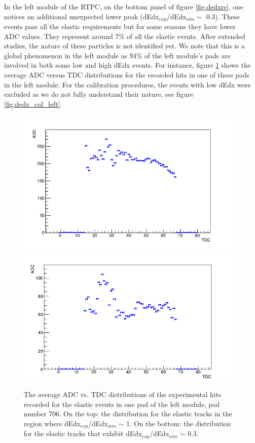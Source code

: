 In the left module of the RTPC, on the bottom panel of figure \ref{fig:dedxre}, 
one notices an additional unexpected lower peak (dEdx$_{exp}$/dEdx$_{sim} \sim$ 
0.3). These events pass all the elastic requirements but for some reasons they 
have lower ADC values. They represent around $7\%$ of all the elastic events.  
After extended studies, the nature of these particles is not identified yet. We 
note that this is a global phenomenon in the left module as 94$\%$ of the left 
module's pads are involved in both some low and high dEdx events. For instance, 
figure \ref{fig:Chann_706} shows the average ADC versus TDC distributions for 
the recorded hits in one of these pads in the left module. For the calibration 
procedures, the events with low dEdx were excluded as we do not fully 
understand their nature, see figure \ref{fig:dedx_cal_left}.
\begin{figure}[tbp]
\centering
\includegraphics[scale=0.4]{fig_rtpc/Chan_706_1.png}
\includegraphics[scale=0.4]{fig_rtpc/Chan_706_2.png}
\caption{The average ADC vs. TDC distributions of the experimental hits 
   recorded for the elastic events in one pad of the left module, pad number 
   706.  On the top: the distribution for the elastic tracks in the region 
   where dEdx$_{exp}$/dEdx$_{sim} $ $\sim$ 1. On the bottom: the distribution 
for the elastic tracks that exhibit dEdx$_{exp}$/dEdx$_{sim} $ $\sim$ 0.3.}
\label{fig:Chann_706}
\end{figure}

